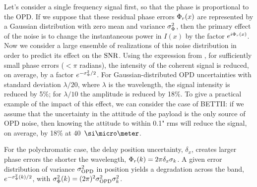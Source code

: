 

Let's consider a single frequency signal first, so that the phase is proportional to the OPD. 
If we suppose that these residual phase errors $\Phi_r(x)$ are represented by a Gaussian distribution with zero mean and variance $\sigma^2_\Phi$, then the primary effect of the noise is to change the instantaneous power in $I(x)$ by the factor $e^{i\Phi_r(x)}$. Now we consider a large ensemble of realizations of this noise distribution in order to predict its effect on the $\textrm{SNR}$. Using the expression from \cite{Richards:2003bp}, for sufficiently small phase errors ($<\pi$ radians), the intensity of the coherent signal is reduced, on average, by a factor $e^{-\sigma^2_\Phi/2}$. For Gaussian-distributed OPD uncertainties with standard deviation $\lambda/20$, where $\lambda$ is the wavelength, the signal intensity is reduced by 5\%; for $\lambda/10$ the amplitude is reduced by 18\%. To give a practical example of the impact of this effect, we can consider the case of BETTII: if we assume that the uncertainty in the attitude of the payload is the only source of OPD noise, then knowing the attitude to within 0.1" rms will reduce the signal, on average, by 18\% at 40~$\um$.

For the polychromatic case, the delay position uncertainty, $\delta_x$, creates larger phase errors the shorter the wavelength, 
$\Phi_r(k) = 2\pi\delta_x \sigma_k$. A given error distribution of variance $\sigma^2_{\textrm{OPD}}$ in position yields a degradation across the band, $e^{-\sigma^2_\Phi(k)/2}$, with $\sigma^2_\Phi(k) = (2\pi)^2\sigma^2_{\textrm{OPD}}\sigma_k^2$.


